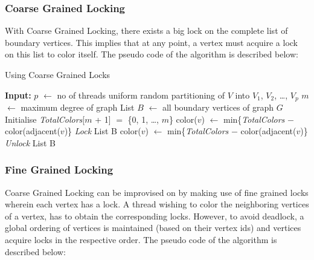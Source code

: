\documentclass[a4paper,11pt]{article}
\begin{document}
\subsubsection{Coarse Grained Locking}
With Coarse Grained Locking, there exists a big lock on the complete list of boundary vertices. This implies that at any point, a vertex must acquire a lock on this list to color itself. The pseudo code of the algorithm is described below:


\begin{algorithm}
\caption{Using Coarse Grained Locks}
\label{alg2}

\begin{algorithmic}[1]
\State \textbf{Input:} $p$ $\leftarrow$ no of threads
\State uniform random partitioning of $V$ into $V_1$, $V_2$, \dots, $V_p$
\State $m$ $\leftarrow$ maximum degree of graph
\State List $B$ $\leftarrow$ all boundary vertices of graph $G$
\State Initialise \textit{TotalColors}[$m$ + 1] $=$ \{0, 1, \dots, $m$\}
\State color($v$) $\leftarrow$ min\{\textit{TotalColors} $-$ color(adjacent($v$)\}
\EndFor
{}
\State \textit{Lock} List B
\State color($v$) $\leftarrow$ min\{\textit{TotalColors} $-$ color(adjacent($v$)\}
\State \textit{Unlock} List B
\EndFor
\EndFor
\EndProcedure
\end{algorithmic}
\end{algorithm}

\subsubsection{Fine Grained Locking}
Coarse Grained Locking can be improvised on by making use of fine grained locks wherein each vertex has a lock. A thread wishing to color the neighboring vertices of a vertex, has to obtain the corresponding locks. However, to avoid deadlock, a global ordering of vertices is maintained (based on their vertex ids) and vertices acquire locks in the respective order. 
The pseudo code of the algorithm is described below:
\end{document}
